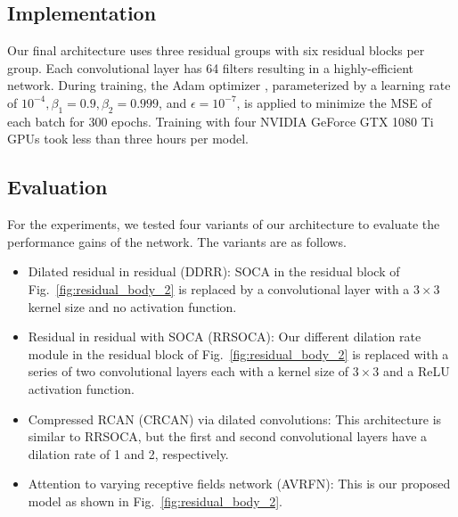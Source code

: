 \documentclass[runningheads]{llncs}
\begin{document}
\subsection{Implementation}
Our final architecture uses three residual groups with six residual blocks per
group. Each convolutional layer has 64 filters resulting in a highly-efficient
network. During training, the Adam optimizer \cite{kingma2014adam},
parameterized by a learning rate of $10^{-4}, \beta_1 = 0.9, \beta_2 = 0.999$,
and $\epsilon = 10^{-7}$, is applied to minimize the MSE of each batch for 300
epochs. Training with four NVIDIA GeForce GTX 1080 Ti GPUs took less than three 
hours per model. 


\subsection{Evaluation}
For the experiments, we tested four variants of our architecture to evaluate
the performance gains of the network. The variants are as follows.
\begin{itemize}
  \item Dilated residual in residual (DDRR): SOCA in the residual block of
  Fig.~\ref{fig:residual_body_2} is replaced by a convolutional layer with a $3
  \times 3$ kernel size and no activation function.
  \item Residual in residual with SOCA (RRSOCA): Our different dilation rate
  module in the residual block of Fig.~\ref{fig:residual_body_2} is replaced
  with a series of two convolutional layers each with a kernel size of $3
  \times 3$ and a ReLU activation function.
  \item Compressed RCAN (CRCAN) via dilated convolutions: This architecture is
  similar to RRSOCA, but the first and second convolutional layers have a
  dilation rate of 1 and 2, respectively.
  \item Attention to varying receptive fields network (AVRFN): This is our
  proposed model as shown in Fig.~\ref{fig:residual_body_2}.
\end{itemize}
\end{document}
